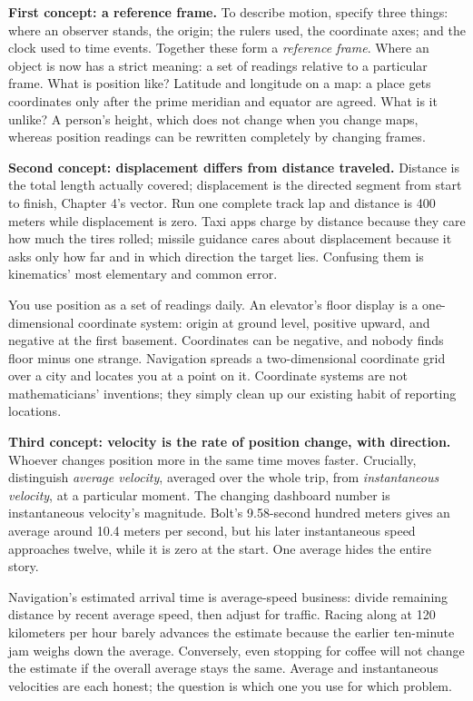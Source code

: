 \begin{mainline}
\textbf{First concept: a reference frame.} To describe motion, specify three things: where an observer stands, the origin; the rulers used, the coordinate axes; and the clock used to time events. Together these form a \emph{reference frame}. Where an object is now has a strict meaning: a set of readings relative to a particular frame. What is position like? Latitude and longitude on a map: a place gets coordinates only after the prime meridian and equator are agreed. What is it unlike? A person's height, which does not change when you change maps, whereas position readings can be rewritten completely by changing frames.

\textbf{Second concept: displacement differs from distance traveled.} Distance is the total length actually covered; displacement is the directed segment from start to finish, Chapter 4's vector. Run one complete track lap and distance is 400 meters while displacement is zero. Taxi apps charge by distance because they care how much the tires rolled; missile guidance cares about displacement because it asks only how far and in which direction the target lies. Confusing them is kinematics' most elementary and common error.

You use position as a set of readings daily. An elevator's floor display is a one-dimensional coordinate system: origin at ground level, positive upward, and negative at the first basement. Coordinates can be negative, and nobody finds floor minus one strange. Navigation spreads a two-dimensional coordinate grid over a city and locates you at a point on it. Coordinate systems are not mathematicians' inventions; they simply clean up our existing habit of reporting locations.

\textbf{Third concept: velocity is the rate of position change, with direction.} Whoever changes position more in the same time moves faster. Crucially, distinguish \emph{average velocity}, averaged over the whole trip, from \emph{instantaneous velocity}, at a particular moment. The changing dashboard number is instantaneous velocity's magnitude. Bolt's 9.58-second hundred meters gives an average around 10.4 meters per second, but his later instantaneous speed approaches twelve, while it is zero at the start. One average hides the entire story.

Navigation's estimated arrival time is average-speed business: divide remaining distance by recent average speed, then adjust for traffic. Racing along at 120 kilometers per hour barely advances the estimate because the earlier ten-minute jam weighs down the average. Conversely, even stopping for coffee will not change the estimate if the overall average stays the same. Average and instantaneous velocities are each honest; the question is which one you use for which problem.


\end{mainline}
